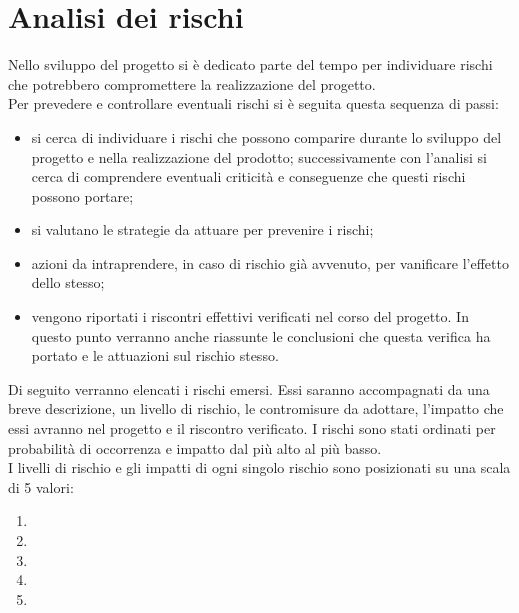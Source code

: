 \section{Analisi dei rischi}
Nello sviluppo del progetto si è dedicato parte del tempo per individuare rischi che potrebbero compromettere la realizzazione del progetto.\\
Per prevedere e controllare eventuali rischi si è seguita questa sequenza di passi:
\begin{itemize}
\item {} si cerca di individuare i rischi che possono comparire durante lo sviluppo del progetto e nella realizzazione del prodotto; successivamente con l'analisi si cerca di comprendere eventuali criticità e conseguenze che questi rischi possono portare;
\item {} si valutano le strategie da attuare  per prevenire i rischi;
\item {} azioni da intraprendere, in caso di rischio già avvenuto, per vanificare l'effetto dello stesso;
\item {} vengono riportati i riscontri effettivi verificati nel corso del progetto. In questo punto verranno anche riassunte le conclusioni che questa verifica ha portato e le attuazioni sul rischio stesso. 
\end{itemize}
Di seguito verranno elencati i rischi emersi. Essi saranno accompagnati da una breve descrizione, un livello di rischio, le contromisure da adottare, l'impatto che essi avranno nel progetto e il riscontro verificato. I rischi sono stati ordinati per probabilità di occorrenza e impatto dal più alto al più basso.\\
I livelli di rischio e gli impatti di ogni singolo rischio sono posizionati su una scala di 5 valori:
\begin{enumerate}
\item {}
\item {}
\item {}
\item {}
\item {}
\end{enumerate}


